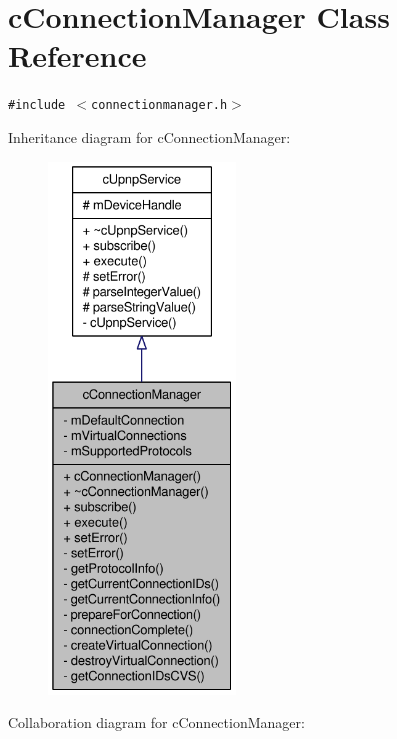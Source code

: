 \hypertarget{classcConnectionManager}{
\section{cConnectionManager Class Reference}
\label{classcConnectionManager}
}
{\tt \#include $<$connectionmanager.h$>$}

Inheritance diagram for cConnectionManager:\nopagebreak
\begin{figure}[H]
\begin{center}
\leavevmode
\includegraphics[height=400pt]{classcConnectionManager__inherit__graph}
\end{center}
\end{figure}
Collaboration diagram for cConnectionManager:\nopagebreak
